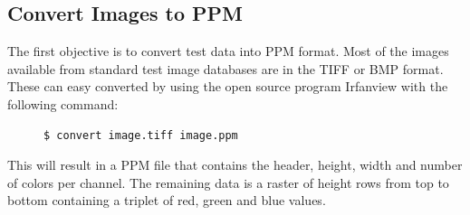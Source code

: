 \documentclass[12pt]{CPP}
\begin{document}
\subsection{Convert Images to PPM}
The first objective is to convert test data into PPM format. Most of the images available from standard test image databases are in the TIFF or BMP format. These can easy converted by using the open source program Irfanview with the following command:

\begin{center}
\begin{figure}[!htbp]
\begin{verbatim}
$ convert image.tiff image.ppm
\end{verbatim}
\end{figure}
\end{center}

This will result in a PPM file that contains the header, height, width and number of colors per channel. The remaining data is a raster of height rows from top to bottom containing a triplet of red, green and blue values.
\end{document}
